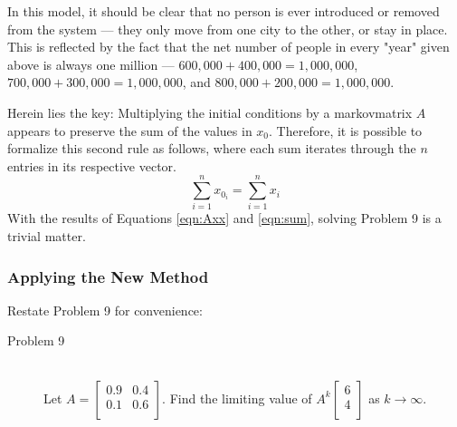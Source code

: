 \documentclass[titlepage]{article}
\begin{document}
In this model, it should be clear that no person is ever introduced or removed from the system --- they only move from one city to the other, or stay in place. This is reflected by the fact that the net number of people in every "year" given above is always one million --- $600,000+400,000=1,000,000$, $700,000+300,000=1,000,000$, and $800,000+200,000=1,000,000$.\par
Herein lies the key: Multiplying the initial conditions by a \Gls{markovmatrix} $A$ appears to preserve the sum of the values in $x_0$. Therefore, it is possible to formalize this second rule as follows, where each sum iterates through the $n$ entries in its respective vector.
\begin{equation}\label{eqn:sum}
    \sum_{i=1}^n x_{0_i} = \sum_{i=1}^n x_i
\end{equation}
With the results of Equations \ref{eqn:Axx} and \ref{eqn:sum}, solving Problem 9 is a trivial matter.

\subsubsection{Applying the New Method}\label{ss2:applying}
Restate Problem 9 for convenience:

\begin{prob}
    \begin{description}
        \item[Problem 9] \hfill \\ Let $
            A =
            \begin{bmatrix}
                0.9 & 0.4\\
                0.1 & 0.6\\
            \end{bmatrix}
        $. Find the limiting value of $
            A^k
            \begin{bmatrix}
                6\\
                4\\
            \end{bmatrix}
        $ as $k\to\infty$.
    \end{description}
\end{prob}
\end{document}
